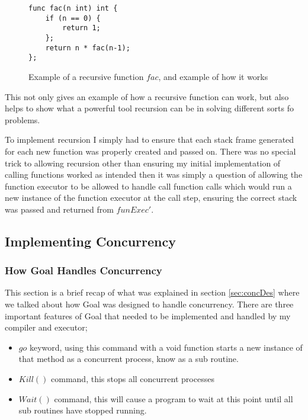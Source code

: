 \begin{figure}
\begin{lstlisting}
func fac(n int) int {
    if (n == 0) {
        return 1;
    }; 
    return n * fac(n-1);
};
\end{lstlisting}
\caption{Example of a recursive function $fac$, and example of how it works }
\label{fig:facExamp}
\end{figure}

This not only gives an example of how a recursive function can work, but also helps to show what a powerful tool recursion can be in solving different sorts fo problems. 

To implement recursion I simply had to ensure that each stack frame generated for each new function was properly created and passed on. There was no special trick to allowing recursion other than ensuring my initial implementation of calling functions worked as intended then it was simply a question of allowing the function executor to be allowed to handle call function calls which would run a new instance of the function executor at the call step, ensuring the correct stack was passed and returned from $funExec'$. 

\subsection{Implementing Concurrency}

\subsubsection{How Goal Handles Concurrency}

This section is a brief recap of what was explained in section \ref{sec:concDes} where we talked about how Goal was designed to handle concurrency. There are three important features of Goal that needed to be implemented and handled by my compiler and executor;

\begin{itemize}
\item $go$ keyword, using this command with a void function starts a new instance of that method as a concurrent process, know as a sub routine.
\item $Kill()$ command, this stops all concurrent processes 
\item $Wait()$ command, this will cause a program to wait at this point until all sub routines have stopped running.
\end{itemize}

